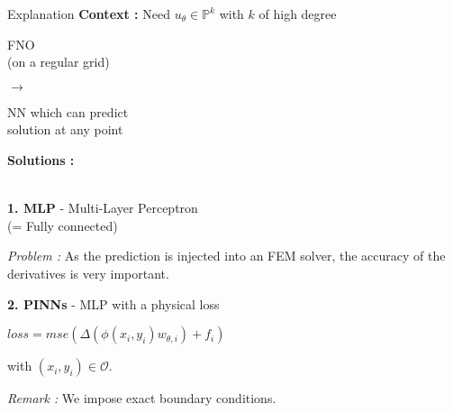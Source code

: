 \begin{frame}{Explanation}
    \textbf{Context :} Need $u_\theta\in\mathbb{P}^k$ with $k$ of high degree

    \begin{center}
        \begin{minipage}{0.28\linewidth}
            \centering
            FNO \\
            (on a regular grid) 
        \end{minipage} $\rightarrow$ \begin{minipage}{0.35\linewidth}
            \centering
            NN which can predict \\
            solution at any point
        \end{minipage}
    \end{center}

    \textbf{Solutions :}

    \vspace{2pt}
    
    \begin{minipage}{0.48\linewidth}
        \; \\
        \textbf{1. MLP} - Multi-Layer Perceptron \\
        (= Fully connected)

        \centering

        \raggedright
        \textit{Problem :} As the prediction is injected into an FEM solver, the accuracy of the derivatives is very important.
    \end{minipage} \quad
    \begin{minipage}{0.48\linewidth}
        \textbf{2. PINNs} - MLP with a physical loss
        \begin{center}
            $loss = mse(\Delta (\phi(x_i,y_i)w_{\theta,i})+f_i)$

            \vspace{1.5pt}
        
        \end{center}

        with $(x_i,y_i)\in\mathcal{O}$.

        \textit{Remark :} We impose exact boundary conditions. \\
    \end{minipage}
\end{frame}

